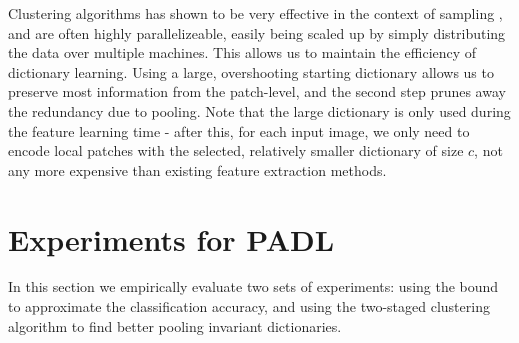 Clustering algorithms has shown to be very effective in the context of \nystrom sampling \cite{kumar2012sampling}, and are often highly parallelizeable, easily being scaled up by simply distributing the data over multiple machines. This allows us to maintain the efficiency of dictionary learning. Using a large, overshooting starting dictionary allows us to preserve most information from the patch-level, and the second step prunes away the redundancy due to pooling. Note that the large dictionary is only used during the feature learning time - after this, for each input image, we only need to encode local patches with the selected, relatively smaller dictionary of size $c$, not any more expensive than existing feature extraction methods.



\section{Experiments for PADL}\label{sec:sizematters:experiments}
In this section we empirically evaluate two sets of experiments: using the bound to approximate the classification accuracy, and using the two-staged clustering algorithm to find better pooling invariant dictionaries.


